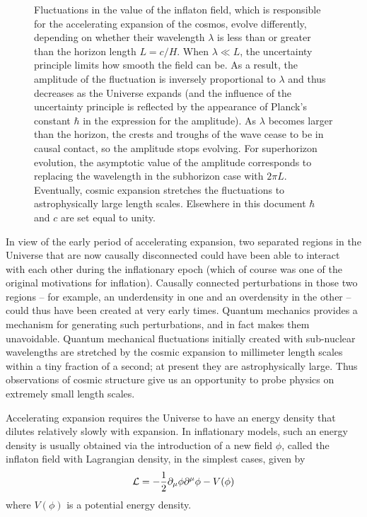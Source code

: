 \begin{figure}[ht]
{Fluctuations in the value of the inflaton field, which is responsible for the accelerating expansion of the cosmos, evolve differently, depending on whether their wavelength $\lambda$ is less than or greater than the horizon length $L = c/H$. When $\lambda \ll L$, the uncertainty principle limits how smooth the field can be. As a result, the amplitude of the fluctuation is inversely proportional to $\lambda$ and thus decreases as the Universe expands (and the influence of the uncertainty principle is reflected by the appearance of Planck's constant $\hbar$ in the expression for the amplitude). As $\lambda$ becomes larger than the horizon, the crests and troughs of the wave cease to be in causal contact, so the amplitude stops evolving. For superhorizon evolution, the asymptotic value of the amplitude corresponds to replacing the wavelength in the subhorizon case with $2\pi L$. Eventually, cosmic expansion stretches the fluctuations to astrophysically large length scales. Elsewhere in this document $\hbar$ and $c$ are set equal to unity.
}
\label{fig:PTfigs}
\end{figure}


In view of the early period of accelerating expansion, two separated regions in the Universe that are now causally disconnected could have been able to interact with each other during the inflationary epoch (which of course was one of the original motivations for inflation). Causally connected perturbations in those two regions -- for example, an underdensity in one and an overdensity in the other -- could thus have been created at very early times. Quantum mechanics provides a mechanism for generating such perturbations, and in fact makes them unavoidable. Quantum mechanical fluctuations initially created with sub-nuclear wavelengths are stretched by the cosmic expansion to millimeter length scales within a tiny fraction of a second; at present they are astrophysically large. Thus observations of cosmic structure give us an opportunity to probe physics on extremely small length scales.

Accelerating expansion requires the Universe to have an energy density that dilutes relatively slowly with expansion. In inflationary models, such an energy density is usually obtained via the introduction of a new field $\phi$, called the inflaton field with Lagrangian density, in the simplest cases, given by
\begin{equation}
{\cal L} = - \frac{1}{2} \partial_\mu \phi \partial^\mu \phi - V(\phi)
\end{equation}
where $V(\phi)$ is a potential energy density. 

